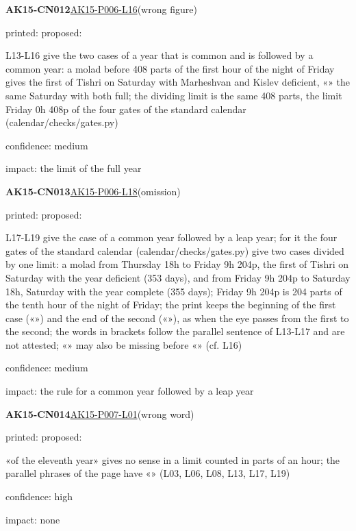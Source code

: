 \documentclass[11pt]{article}
\begin{document}
\noindent\textbf{AK15-CN012}\enspace\hyperlink{AK15-P006-L16}{AK15-P006-L16}\enspace(wrong figure)\par\noindent printed: \enspace proposed: \par\noindent L13-L16 give the two cases of a year that is common and is followed by a common year: a molad before 408 parts of the first hour of the night of Friday gives the first of Tishri on Saturday with Marheshvan and Kislev deficient, «» the same Saturday with both full; the dividing limit is the same 408 parts, the limit Friday 0h 408p of the four gates of the standard calendar (calendar/checks/gates.py)\par\noindent confidence: medium\par\noindent impact: the limit of the full year\par\medskip
\noindent\textbf{AK15-CN013}\enspace\hyperlink{AK15-P006-L18}{AK15-P006-L18}\enspace(omission)\par\noindent printed: \enspace proposed: \par\noindent L17-L19 give the case of a common year followed by a leap year; for it the four gates of the standard calendar (calendar/checks/gates.py) give two cases divided by one limit: a molad from Thursday 18h to Friday 9h 204p, the first of Tishri on Saturday with the year deficient (353 days), and from Friday 9h 204p to Saturday 18h, Saturday with the year complete (355 days); Friday 9h 204p is 204 parts of the tenth hour of the night of Friday; the print keeps the beginning of the first case («») and the end of the second («»), as when the eye passes from the first  to the second; the words in brackets follow the parallel sentence of L13-L17 and are not attested; «» may also be missing before «» (cf. L16)\par\noindent confidence: medium\par\noindent impact: the rule for a common year followed by a leap year\par\medskip
\noindent\textbf{AK15-CN014}\enspace\hyperlink{AK15-P007-L01}{AK15-P007-L01}\enspace(wrong word)\par\noindent printed: \enspace proposed: \par\noindent «of the eleventh year» gives no sense in a limit counted in parts of an hour; the parallel phrases of the page have «» (L03, L06, L08, L13, L17, L19)\par\noindent confidence: high\par\noindent impact: none\par\medskip
\end{document}
